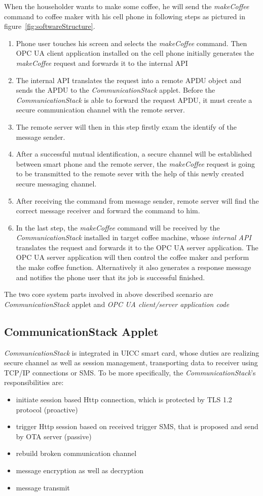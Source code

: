 When the householder wants to make some coffee, he will send the \emph{makeCoffee} command to coffee maker with his cell phone in following steps as pictured in figure~\ref{fig:softwareStructure}. 
\begin{enumerate}
\item Phone user touches his screen and selects the \emph{makeCoffee} command. Then OPC UA client application installed on the cell phone initially generates the \emph{makeCoffee} request and forwards it to the internal API
\item The internal API translates the request into a remote APDU object and sends the APDU to the \emph{CommunicationStack} applet. Before the \emph{CommunicationStack} is able to forward the request APDU, it must create a secure communication channel with the remote server.
\item The remote server will then in this step firstly exam the identify of the message sender.
\item After a successful mutual identification, a secure channel will be established between smart phone and the remote server, the \emph{makeCoffee} request is going to be transmitted  to the remote sever with the help of this newly created secure messaging channel.
\item After receiving the command from message sender, remote server will find the correct message receiver and forward the command to him. 
\item  In the last step, the \emph{makeCoffee} command will be received by the \emph{CommunicationStack} installed in target coffee machine, whose \emph{internal API} translates the request and forwards it to the OPC UA server application. The OPC UA server application will then control the coffee maker and perform the make coffee function. Alternatively it also generates a response message and notifies the phone user that its job is successful finished. 
\end{enumerate}
The two core system parts involved in above described scenario are \emph{CommunicationStack} applet and \emph{OPC UA client/server application code} 

\subsection{CommunicationStack Applet}
\emph{CommunicationStack} is integrated in UICC smart card, whose duties are realizing secure channel as well as session management, transporting data to receiver using TCP/IP connections or SMS. To be more specifically, the \emph{CommunicationStack}'s responsibilities are:
\begin{itemize}
  \item initiate session based Http connection, which is protected by TLS 1.2 protocol  (proactive)
  \item trigger Http session based on received trigger SMS, that is proposed and send by OTA server (passive)
  \item rebuild broken communication channel
  \item message encryption as well as decryption
  \item message transmit
\end{itemize}

